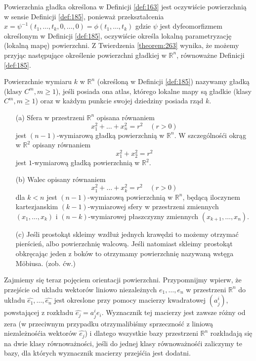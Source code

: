 \documentclass[leqno]{article}
\begin{document}
\begin{justify}
\begin{uwaga}
    Powierzchnia gładka określona w Definicji \ref{def:163} jest oczywiście powierzchnią w sensie Definicji \ref{def:185}, ponieważ 
    przekształcenia $x = \psi^{-1}(t_1, \ldots, t_k, 0, \ldots, 0) = \phi(t_1, \ldots, t_k)$ gdzie $\psi$ jest dyfeomorfizmem określonym 
    w Definicji \ref{def:185}, oczywiście określa lokalną parametryzację (lokalną mapę) powierzchni.
    Z Twierdzenia \ref{theorem:263} wynika, że możemy przyjąc następujące określenie powierzchni gładkiej w $\mathbb{R}^n$, równoważne Definicji \ref{def:185}.
\end{uwaga}

\begin{defn}
    Powierzchnie wymiaru $k$ w $\mathbb{R}^n$ (określoną w Definicji \ref{def:185}) nazywamy gładką (klasy $C^m, m \geqslant 1$), jeśli posiada ona 
    atlas, którego lokalne mapy są gładkie (klasy $C^m, m \geqslant 1$) oraz w każdym punkcie swojej dziedziny posiada rząd $k$.
\end{defn}

\begin{ex}
    \begin{itemize}
        \item [(a)] Sfera w przestrzeni $\mathbb{R}^n$ opisana równaniem 
        \[
            x_1^2 + \ldots + x_n^2 = r^2 \quad (r > 0)
        \]
        jest $(n-1)$-wymiarową gładką powierzchnią w $\mathbb{R}^n$. W szczególnośći okrąg w $\mathbb{R}^2$ opisany równaniem 
        \[
            x_1^2 + x_2^2 = r^2
        \]
        jest $1$-wymiarową gładką powierzchnią w $\mathbb{R}^2$.
        \item [(b)]
            Walec opisany równaniem 
            \[
                x_1^2 + \ldots + x^2_k = r^2 \quad (r > 0)
            \]
            dla $k < n$ jest $(n-1)$-wymiarową powierzchnią w $\mathbb{R}^n$, będącą iloczynem kartezjanskim $(k-1)$-wymiarowej sfery w przestrzeni zmiennych $(x_1, \ldots, x_k)$ i 
            $(n-k)$-wymiarowej płaszczyzny zmiennych $(x_{k+1}, \ldots, x_n)$.
        \item [(c)]
            Jeśli prostokąt skleimy wzdłuż jednych krawędzi to możemy otrzymać pierścień, albo powierzchnię walcową. Jeśli natomiast skleimy prostokąt obkręcając jeden z boków to otrzymamy 
            powierzchnię nazywaną wstęga Möbiusa. (zob. ćw.)
    \end{itemize}
\end{ex}

Zajmiemy się teraz pojęciem orientacji powierzchni. Przypomnijmy wpierw, że przejście od układu wektorów liniowo niezależnych $e_1, \ldots, e_n$ 
w przestrzeni $\mathbb{R}^n$ do układu $\hat{e_1}, \ldots, \hat{e_n}$ jest okreslone przy pomocy macierzy kwadratowej $(a^i_j)$,
powstającej z rozkładu $\hat{e_j}=a^i_je_i$. Wyznacznik tej macierzy jest zawsze różny od zera (w przeciwnym przypadku otrzymalibiśmy sprzeczność z liniową niezależnośćia wektorów
$\hat{e_j}$) i dlatego wszystkie bazy przestrzeni $\mathbb{R}^n$ rozkładają się na dwie klasy równoważności, jeśli do jednej klasy równoważnośći zaliczymy te bazy, 
dla których wyznacznik macierzy przejśćia jest dodatni.


\end{justify}
\end{document}
